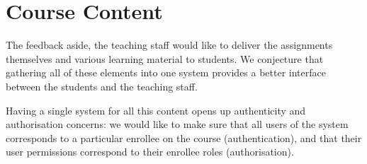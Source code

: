 
\section{Course Content}

The feedback aside, the teaching staff would like to deliver the assignments
themselves and various learning material to students. We conjecture that
gathering all of these elements into one system provides a better interface
between the students and the teaching staff.

Having a single system for all this content opens up authenticity and
authorisation concerns: we would like to make sure that all users of the system
corresponds to a particular enrollee on the course (authentication), and that
their user permissions correspond to their enrollee roles (authorisation).
